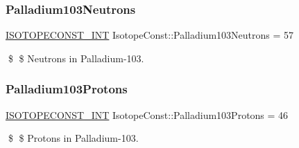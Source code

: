 \subsubsection{\texorpdfstring{Palladium103\+Neutrons}{Palladium103Neutrons}}
{\footnotesize\ttfamily \mbox{\hyperlink{group___isotope_const-_macros_ga5f18360b3e99483a35c32d789e62621c}{I\+S\+O\+T\+O\+P\+E\+C\+O\+N\+S\+T\+\_\+\+I\+NT}} Isotope\+Const\+::\+Palladium103\+Neutrons = 57}

\$ \$ Neutrons in Palladium-\/103. \mbox{\label{group___isotope_const-_palladium-_pd103_gaed14eed5c07ad5328b50eba1ff53dd17}} 
\subsubsection{\texorpdfstring{Palladium103\+Protons}{Palladium103Protons}}
{\footnotesize\ttfamily \mbox{\hyperlink{group___isotope_const-_macros_ga5f18360b3e99483a35c32d789e62621c}{I\+S\+O\+T\+O\+P\+E\+C\+O\+N\+S\+T\+\_\+\+I\+NT}} Isotope\+Const\+::\+Palladium103\+Protons = 46}

\$ \$ Protons in Palladium-\/103. 